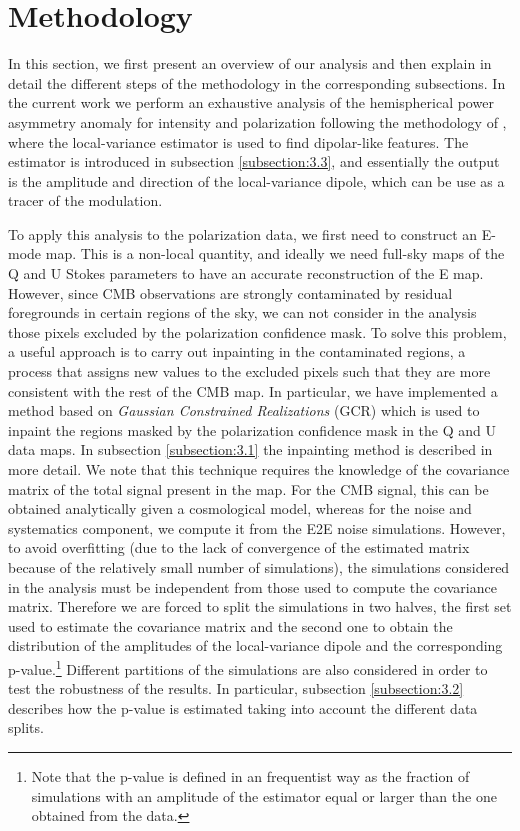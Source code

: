 \section{Methodology} \label{Met}

In this section, we first present an overview of our analysis and then explain in detail the different steps of the methodology in the corresponding subsections.
In the current work we perform an exhaustive analysis of the hemispherical power asymmetry anomaly for intensity and polarization following the methodology of \cite{Planck:2019evm}, where the local-variance estimator is used to find dipolar-like features. The estimator is introduced in subsection \ref{subsection:3.3}, and essentially the output is the amplitude and direction of the local-variance dipole, which can be use as a tracer of the modulation.

To apply this analysis to the polarization data, we first need to construct an E-mode map. This is a non-local quantity, and ideally we need full-sky maps of the Q and U Stokes parameters to have an accurate reconstruction of the E map. However, since CMB observations are strongly contaminated by residual foregrounds in certain regions of the sky, we can not consider in the analysis those pixels excluded by the polarization confidence mask. To solve this problem, a useful approach is to carry out inpainting in the contaminated regions, a process that assigns new values to the excluded pixels such that they are more consistent with the rest of the CMB map. In particular, we have implemented a method based on \emph{Gaussian Constrained Realizations} (GCR) which is used to inpaint the regions masked by the polarization confidence mask in the Q and U data maps.
In subsection \ref{subsection:3.1} the inpainting method is described in more detail. 
We note that this technique requires the knowledge of the covariance matrix of the total signal present in the map. For the CMB signal, 
this can be obtained analytically given a cosmological model, whereas for the noise and systematics component, we compute it from the E2E noise simulations. However, to avoid overfitting (due to the lack of convergence of the estimated matrix because of the relatively small number of simulations), 
the simulations considered in the analysis must be independent from those used to compute the covariance matrix. Therefore we are forced to split the simulations in two halves, the first set used to estimate the covariance matrix and the second one to obtain the distribution of the amplitudes of the local-variance dipole and the corresponding p-value.\footnote{Note that the p-value is defined in an frequentist way as the fraction of simulations with an amplitude of the estimator equal or larger than the one obtained from the data.} Different partitions of the simulations are also considered in order to test the robustness of the results. In particular, subsection \ref{subsection:3.2} describes how the p-value is estimated taking into account the different data splits.

